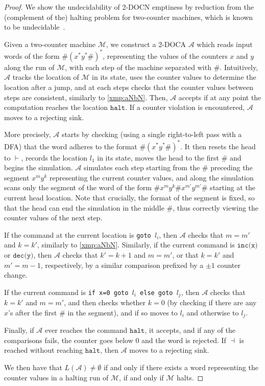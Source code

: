 \documentclass[11pt,a4paper]{amsart}
\theoremstyle{definition}
\newcommand{\lmark}{\vdash}
\newcommand{\rmark}{\dashv}
\newcommand{\cA}{\mathcal{A}}
\newcommand{\cM}{\mathcal{M}}
\begin{document}
\begin{proof}
	We show the undecidability of 2-DOCN emptiness by reduction from the
	(complement of the) halting problem for two-counter machines, which is known to be
	undecidable~\cite{minsky1967computation}.
	
	Given a two-counter machine $\cM$, we construct a 2-DOCA $\cA$ which reads
	input words of the form $\#(x^*y^*\#)^*$, representing the values of the
	counters $x$ and $y$ along the run of $\cM$, with each step of the machine
	separated with $\#$.  Intuitively, $\cA$ tracks the location of $\cM$ in its
	state, uses the counter values to determine the location after a jump, and at
	each steps checks that the counter values between steps are consistent,
	similarly to \cref{xmp:aNbN}.  Then, $\cA$ accepts if at any point the
	computation reaches the location $\texttt{halt}$. If a counter violation is
	encountered, $\cA$ moves to a rejecting sink.
	
	More precisely, $\cA$ starts by checking (using a single right-to-left pass
	with a DFA) that the word adheres to the format $\#(x^*y^*\#)^*$. It then
	resets the head to $\lmark$, records the location $l_1$ in its state, moves
	the head to the first $\#$ and begins the simulation.  $\cA$ simulates each
	step starting from the $\#$ preceding the segment $x^my^k$ representing the
	current counter values, and along the simulation scans only the segment of the
	word of the form $\#x^my^k\#x^{m'}y^{m'}\#$ starting at the current head
	location.  Note that crucially, the format of the segment is fixed, so that
	the head can end the simulation in the middle $\#$, thus correctly viewing the
	counter values of the next step.
	
	If the command at the current location is \texttt{goto $l_i$}, then $\cA$
	checks that $m=m'$ and $k=k'$, similarly to \cref{xmp:aNbN}. Similarly, if the
	current command is $\texttt{inc(x)}$ or $\texttt{dec(y)}$, then $\cA$
	checks that $k'=k+1$ and $m=m'$, or that $k=k'$ and $m'=m-1$, respectively, by
	a similar comparison prefixed by a $\pm1$ counter change.
	
	If the current command is \texttt{if x=0 goto $l_i$ else goto $l_j$},
	then $\cA$ checks that $k=k'$ and $m=m'$, and then checks whether $k=0$ (by
	checking if there are any $x$'s after the first $\#$ in the segment), and if
	so moves to $l_i$ and otherwise to $l_j$.
	
	Finally, if $\cA$ ever reaches the command $\texttt{halt}$, it accepts, and if
	any of the comparisons fails, the counter goes below 0 and the word is
	rejected. If $\rmark$ is reached without reaching $\texttt{halt}$, then $\cA$
	moves to a rejecting sink.
	
	We then have that $L(\cA)\neq \emptyset$ if and only if there exists a word representing
	the counter values in a halting run of $\cM$, if and only if $\cM$ halts.
\end{proof}
\end{document}
